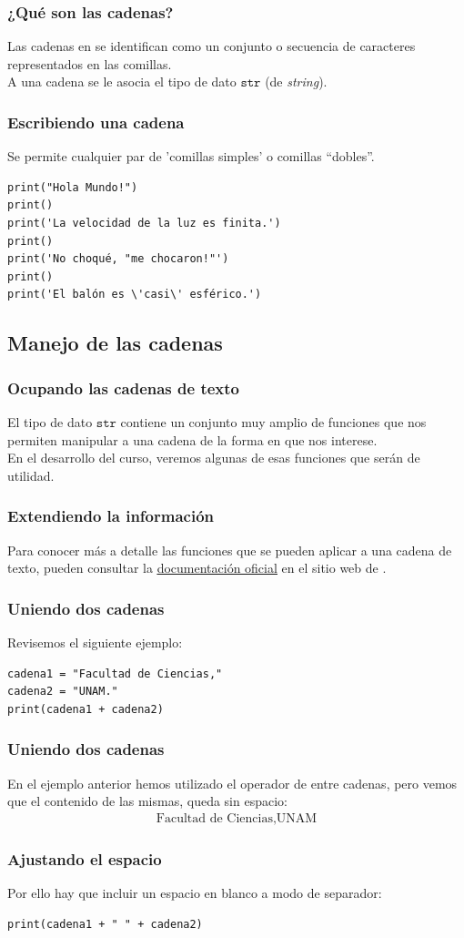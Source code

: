 \documentclass[12pt]{beamer}
\begin{document}
\begin{frame}
\frametitle{¿Qué son las cadenas?}
Las cadenas en \python{} se identifican como un conjunto o secuencia de caracteres representados en las comillas.
\\
\bigskip
\pause
A una cadena se le asocia el tipo de dato $\texttt{str}$ (de \emph{string}).
\end{frame}
\begin{frame}[fragile]
\frametitle{Escribiendo una cadena}
Se permite cualquier par de 'comillas simples' o comillas \enquote{dobles}.
\pause
\begin{lstlisting}[caption=Escribiendo cadenas de texto]
print("Hola Mundo!")
print()
print('La velocidad de la luz es finita.')
print()
print('No choqué, "me chocaron!"')
print()
print('El balón es \'casi\' esférico.')
\end{lstlisting}
\end{frame}

\subsection{Manejo de las cadenas}

\begin{frame}
\frametitle{Ocupando las cadenas de texto}
El tipo de dato $\texttt{str}$ contiene un conjunto muy amplio de funciones que nos permiten manipular a una cadena de la forma en que nos interese.
\\
\bigskip
\pause
En el desarrollo del curso, veremos algunas de esas funciones que serán de utilidad.
\end{frame}
\begin{frame}
\frametitle{Extendiendo la información}
Para conocer más a detalle las funciones que se pueden aplicar a una cadena de texto, pueden consultar la \underline{\href{https://docs.python.org/es/3/library/string.html}{documentación oficial}} en el sitio web de \python.
\end{frame}
\begin{frame}[fragile]
\frametitle{Uniendo dos cadenas}
Revisemos el siguiente ejemplo:
\pause
\begin{lstlisting}[caption=Concatenación de cadenas]
cadena1 = "Facultad de Ciencias,"
cadena2 = "UNAM."
print(cadena1 + cadena2)
\end{lstlisting}
\end{frame}
\begin{frame}
\frametitle{Uniendo dos cadenas}
En el ejemplo anterior hemos utilizado el operador de  entre cadenas, \pause pero vemos que el contenido de las mismas, queda sin espacio:
\begin{align*}
\mbox{Facultad de Ciencias,UNAM}
\end{align*}
\end{frame}
\begin{frame}[fragile]
\frametitle{Ajustando el espacio}
Por ello hay que incluir un espacio en blanco a modo de separador:
\pause
\begin{lstlisting}[caption=Ajustando el espacio entre las cadenas,]
print(cadena1 + " " + cadena2)
\end{lstlisting}
\end{frame}
\end{document}
